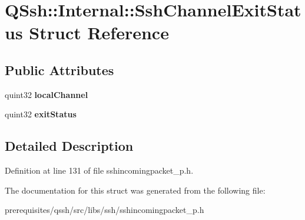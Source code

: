\hypertarget{struct_q_ssh_1_1_internal_1_1_ssh_channel_exit_status}{}\section{Q\+Ssh\+:\+:Internal\+:\+:Ssh\+Channel\+Exit\+Status Struct Reference}
\label{struct_q_ssh_1_1_internal_1_1_ssh_channel_exit_status}
\subsection*{Public Attributes}
\begin{DoxyCompactItemize}
\item 
\mbox{\label{struct_q_ssh_1_1_internal_1_1_ssh_channel_exit_status_a5fdf26214c635a29933ce4eab8ee3f3b}} 
quint32 {\bfseries local\+Channel}
\item 
\mbox{\label{struct_q_ssh_1_1_internal_1_1_ssh_channel_exit_status_a29c71f4471099d55d2629e0dbb17eb74}} 
quint32 {\bfseries exit\+Status}
\end{DoxyCompactItemize}


\subsection{Detailed Description}


Definition at line 131 of file sshincomingpacket\+\_\+p.\+h.



The documentation for this struct was generated from the following file\+:\begin{DoxyCompactItemize}
\item 
prerequisites/qssh/src/libs/ssh/sshincomingpacket\+\_\+p.\+h\end{DoxyCompactItemize}
